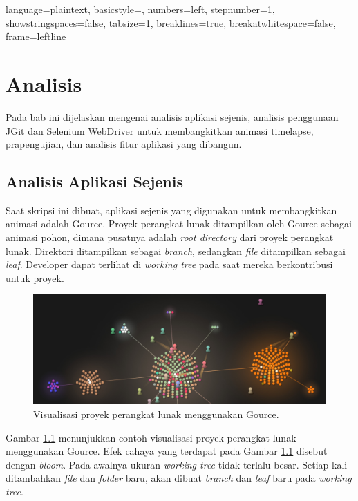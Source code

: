 
\lstset
{ 
     language=plaintext,
     basicstyle=\footnotesize,
     numbers=left,
     stepnumber=1,
     showstringspaces=false,
     tabsize=1,
     breaklines=true,
     breakatwhitespace=false,
     frame=leftline
}

\chapter{Analisis}
\label{chap:analisis}
Pada bab ini dijelaskan mengenai analisis aplikasi sejenis, analisis penggunaan JGit dan Selenium WebDriver untuk membangkitkan animasi timelapse, prapengujian, dan analisis fitur aplikasi yang dibangun. 

\section{Analisis Aplikasi Sejenis}
\label{sec:analisis_aplikasi_sejenis}
Saat skripsi ini dibuat, aplikasi sejenis yang digunakan untuk membangkitkan animasi adalah Gource.  
Proyek perangkat lunak ditampilkan oleh Gource sebagai animasi pohon, dimana pusatnya adalah \textit{root directory} dari proyek perangkat lunak\cite{Gource}. Direktori ditampilkan sebagai \textit{branch}, sedangkan \textit{file} ditampilkan sebagai \textit{leaf}. Developer dapat terlihat di \textit{working tree} pada saat mereka berkontribusi untuk proyek.

\begin{figure}[H]
	\centering
		\includegraphics[scale=0.2]{Gambar/gource.jpg}
	\caption{Visualisasi proyek perangkat lunak menggunakan Gource.}
	\label{fig:gource}
\end{figure}

Gambar \ref{fig:gource} menunjukkan contoh visualisasi proyek perangkat lunak menggunakan Gource. Efek cahaya yang terdapat pada Gambar \ref{fig:gource} disebut dengan \textit{bloom}. Pada awalnya ukuran \textit{working tree} tidak terlalu besar. Setiap kali ditambahkan \textit{file} dan \textit{folder} baru, akan dibuat \textit{branch} dan \textit{leaf} baru pada \textit{working tree}.  

